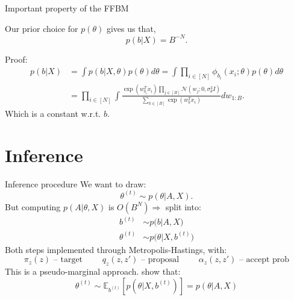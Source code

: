 \documentclass{beamer}
\newcommand{\Gaussian}{\mathcal{N}}
\begin{document}
	\begin{frame}{Important property of the FFBM}
		\begin{theorem}
			Our prior choice for $p(\theta)$ gives us that,
			$$p(b|X) = B^{-N}.$$
		\end{theorem}
		
		Proof:
		\begin{align*}
			p(b | X) &= \int p(b | X, \theta) p(\theta) d\theta = \int \prod_{i \in [N] } \phi_{b_i}(x_i; \theta) p(\theta) d\theta \\
			&= \prod_{i \in [N]} \int \frac{\exp(w_{b_i}^T x_i) \prod_{j \in [B]} \Gaussian(w_j; 0, \sigma_\theta^2 I)}{\sum_{k \in [B]} \exp(w_{k}^T x_i)} dw_{1:B}.
		\end{align*}
		Which is a constant w.r.t. $b$.
	\end{frame}

	\section{Inference}
	\begin{frame}{Inference procedure}
		We want to draw:
		$$\theta^{(t)} \sim p(\theta| A, X).$$
		But computing $p(A| \theta, X)$ is $O(B^N) \Rightarrow$  split into:
		\begin{align*}
			b^{(t)} &\sim p \Big( b| A, X \Big) \\
			\theta^{(t)} &\sim p \Big( \theta| X, b^{(t)} \Big)
		\end{align*}
		Both steps implemented through Metropolis-Hastings, with:
		$$\pi_z(z) \textrm{ -- target } \qquad q_z(z, z') \textrm{ -- proposal } \qquad \alpha_z(z, z') \textrm{ -- accept prob}$$		
		This is a pseudo-marginal approach. \citet{pseudo-marginal} show that:
		$$\theta^{(t)} \sim \mathbb{E}_{b^{(t)}}\left[ p(\theta| X, b^{(t)})\right] = p(\theta | A, X)$$
	\end{frame}
	
\end{document}
